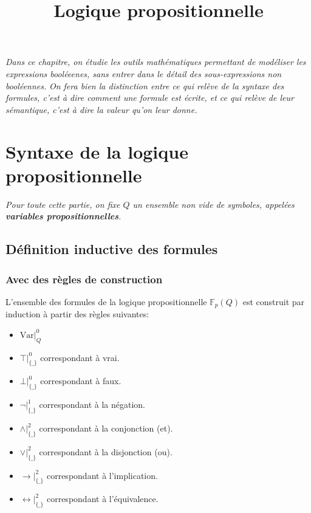 \documentclass{scrartcl}
\title{Logique propositionnelle}
\author{}
\date{}
\newcommand{\fpq}{\mathbb{F}_p(Q)}
\begin{document}
	\maketitle
	\textsl{Dans ce chapitre, on étudie les outils mathématiques permettant de modéliser les expressions booléeenes, sans entrer dans le détail des sous-expressions non booléennes.}
	\textsl{On fera bien la distinction entre ce qui relève de la syntaxe des formules, c'est à dire comment une formule est écrite, et ce qui relève de leur sémantique, c'est à dire la valeur qu'on leur donne.}
	\section{Syntaxe de la logique propositionnelle}
		\begin{center}\textsl{Pour toute cette partie, on fixe $Q$ un ensemble non vide de symboles, appelées \textbf{variables propositionnelles}.}\end{center}
		\subsection{Définition inductive des formules}
			\subsubsection{Avec des règles de construction}
				L'ensemble des formules de la logique propositionnelle $\fpq$ est construit par induction à partir des règles suivantes:
				
				\begin{multicols}{2}
				\begin{itemize}
					\item $\text{Var}\big|_Q^0$
					\item $\top\big|_{\{\_\}}^0$ correspondant à vrai.
					\item $\bot\big|_{\{\_\}}^0$ correspondant à faux.
					\item $\neg\big|_{\{\_\}}^1$ correspondant à la négation.
					\item $\wedge\big|_{\{\_\}}^2$ correspondant à la conjonction (et).
					\item $\vee\big|_{\{\_\}}^2$ correspondant à la disjonction (ou).
					\item $\rightarrow\big|_{\{\_\}}^2$ correspondant à l'implication.
					\item $\leftrightarrow\big|_{\{\_\}}^2$ correspondant à l'équivalence.
				\end{itemize}
				\end{multicols}
\end{document}
